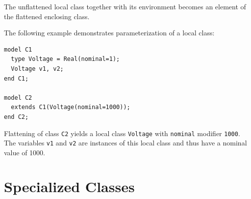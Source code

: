 The unflattened local class together with its environment becomes an element of the flattened enclosing class.

\begin{example}
The following example demonstrates parameterization of a local class:
\begin{lstlisting}[language=modelica]
model C1
  type Voltage = Real(nominal=1);
  Voltage v1, v2;
end C1;

model C2
  extends C1(Voltage(nominal=1000));
end C2;
\end{lstlisting}

Flattening of class \lstinline!C2! yields a local class \lstinline!Voltage! with \lstinline!nominal! modifier \lstinline!1000!.
The variables \lstinline!v1! and \lstinline!v2! are instances of this local class and thus have a nominal value of 1000.
\end{example}

\section{Specialized Classes}\label{specialized-classes}


